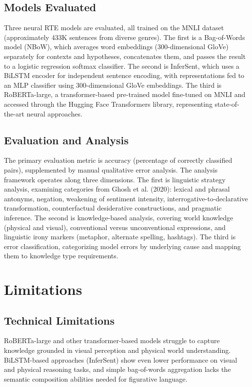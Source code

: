 \documentclass[12pt]{article}
\begin{document}
\subsection{Models Evaluated}

Three neural RTE models are evaluated, all trained on the MNLI dataset (approximately 433K sentences from diverse genres). The first is a Bag-of-Words model (NBoW), which averages word embeddings (300-dimensional GloVe) separately for contexts and hypotheses, concatenates them, and passes the result to a logistic regression softmax classifier. The second is InferSent, which uses a BiLSTM encoder for independent sentence encoding, with representations fed to an MLP classifier using 300-dimensional GloVe embeddings. The third is RoBERTa-large, a transformer-based pre-trained model fine-tuned on MNLI and accessed through the Hugging Face Transformers library, representing state-of-the-art neural approaches.

\subsection{Evaluation and Analysis}

The primary evaluation metric is accuracy (percentage of correctly classified pairs), supplemented by manual qualitative error analysis. The analysis framework operates along three dimensions. The first is linguistic strategy analysis, examining categories from Ghosh et al. (2020): lexical and phrasal antonyms, negation, weakening of sentiment intensity, interrogative-to-declarative transformation, counterfactual desiderative constructions, and pragmatic inference. The second is knowledge-based analysis, covering world knowledge (physical and visual), conventional versus unconventional expressions, and linguistic irony markers (metaphor, alternate spelling, hashtags). The third is error classification, categorizing model errors by underlying cause and mapping them to knowledge type requirements.

\section{Limitations}

\subsection{Technical Limitations}

RoBERTa-large and other transformer-based models struggle to capture knowledge grounded in visual perception and physical world understanding. BiLSTM-based approaches (InferSent) show even lower performance on visual and physical reasoning tasks, and simple bag-of-words aggregation lacks the semantic composition abilities needed for figurative language.
\end{document}
